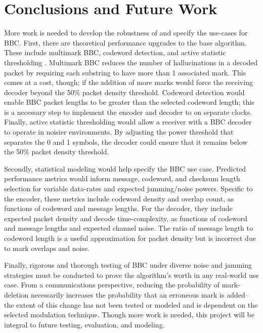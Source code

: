 \documentclass[conference]{IEEEtran}
\begin{document}
{\newpage
\section{Conclusions and Future Work}
  
More work is needed to develop the robustness of and specify the use-cases for BBC. First, there are theoretical performance upgrades to the base algorithm. These include multimark BBC, codeword detection, and active statistic thresholding \cite{ogBBC}. Multimark BBC reduces the number of hallucinations in a decoded packet by requiring each substring to have more than 1 associated mark. This comes at a cost, though; if the addition of more marks would force the receiving decoder beyond the 50\% packet density threshold. Codeword detection would enable BBC packet lengths to be greater than the selected codeword length; this is a necessary step to implement the encoder and decoder to on separate clocks. Finally, active statistic thresholding would allow a receiver with a BBC decoder to operate in noisier environments. By adjusting the power threshold that separates the 0 and 1 symbols, the decoder could ensure that it remains below the 50\% packet density threshold.

Secondly, statistical modeling would help specify the BBC use case. Predicted performance metrics would inform message, codeword, and checksum length selection for variable data-rates and expected jamming/noise powers. Specific to the encoder, these metrics include codeword density and overlap count, as functions of codeword and message lengths. For the decoder, they include expected packet density and decode time-complexity, as functions of codeword and message lengths and expected channel noise. The ratio of message length to codeword length is a useful approximation for packet density but is incorrect due to mark overlaps and noise. 

Finally, rigorous and thorough testing of BBC under diverse noise and jamming strategies must be conducted to prove the algorithm's worth in any real-world use case. From a communications perspective, reducing the probability of mark-deletion necessarily increases the probability that an erroneous mark is added-- the extent of this change has not been tested or modeled and is dependent on the selected modulation technique. Though more work is needed, this project will be integral to future testing, evaluation, and modeling.



\nocite{*}


}
\end{document}
